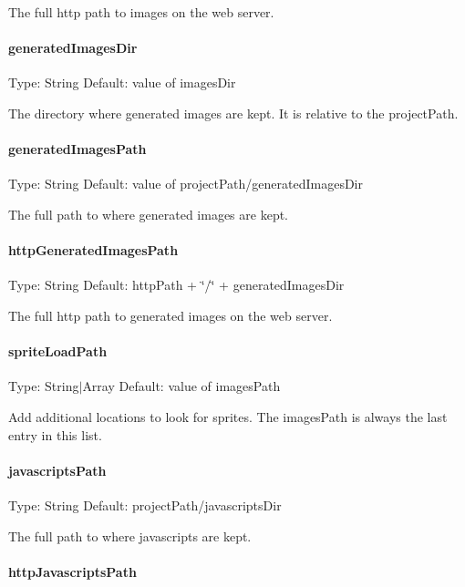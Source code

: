 The full http path to images on the web server.

\paragraph*{generated\+Images\+Dir}

Type\+: {\ttfamily String} Default\+: value of {\ttfamily images\+Dir}

The directory where generated images are kept. It is relative to the {\ttfamily project\+Path}.

\paragraph*{generated\+Images\+Path}

Type\+: {\ttfamily String} Default\+: value of {\ttfamily project\+Path/generated\+Images\+Dir}

The full path to where generated images are kept.

\paragraph*{http\+Generated\+Images\+Path}

Type\+: {\ttfamily String} Default\+: {\ttfamily http\+Path + \char`\"{}/\char`\"{} + generated\+Images\+Dir}

The full http path to generated images on the web server.

\paragraph*{sprite\+Load\+Path}

Type\+: {\ttfamily String$\vert$\+Array} Default\+: value of {\ttfamily images\+Path}

Add additional locations to look for sprites. The images\+Path is always the last entry in this list.

\paragraph*{javascripts\+Path}

Type\+: {\ttfamily String} Default\+: {\ttfamily project\+Path/javascripts\+Dir}

The full path to where javascripts are kept.

\paragraph*{http\+Javascripts\+Path}

